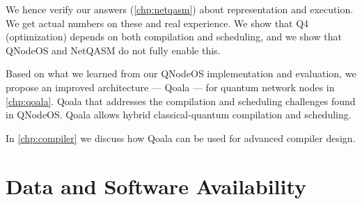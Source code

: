 We hence verify our answers (\cref{chp:netqasm}) about representation and execution.
We get actual numbers on these and real experience.
We show that Q4 (optimization) depends on both compilation and scheduling,
and we show that QNodeOS and NetQASM do not fully enable this.


Based on what we learned from our QNodeOS implementation and evaluation, we propose an improved architecture --- Qoala --- for quantum network nodes in \cref{chp:qoala}.
Qoala that addresses the compilation and scheduling challenges found in QNodeOS.
Qoala allows hybrid classical-quantum compilation and scheduling.

In \cref{chp:compiler} we discuss how Qoala can be used for advanced compiler design.










\section{Data and Software Availability}

